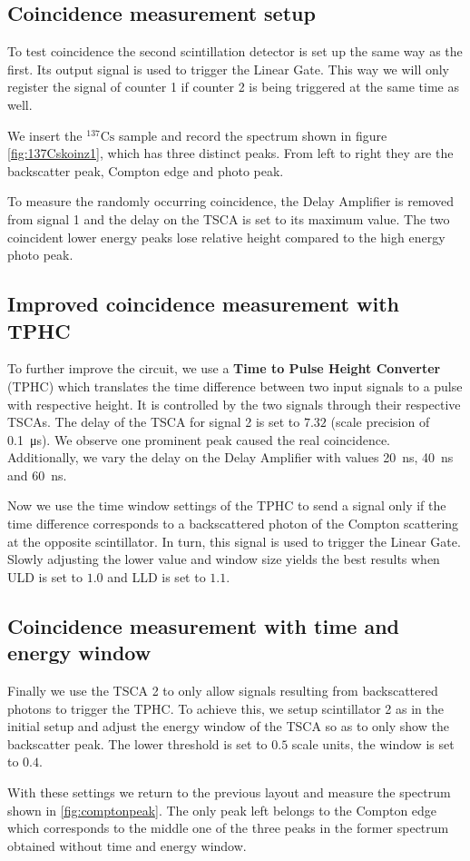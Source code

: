 \subsection*{Coincidence measurement setup}
%
To test coincidence the second scintillation detector is set up the same way as the first.
Its output signal is used to trigger the Linear Gate.
This way we will only register the signal of counter 1 if counter 2 is being triggered at the same time as well.
%
\par
%
We insert the $^{137}\text{Cs}$ sample and record the spectrum shown in figure \ref{fig:137Cskoinz1}, which has three distinct peaks.
From left to right they are the backscatter peak, Compton edge and photo peak.
%
\par
%
To measure the randomly occurring coincidence, the Delay Amplifier is removed from signal 1 and  the delay on the TSCA is set to its maximum value.
The two coincident lower energy peaks lose relative height compared to the high energy photo peak.
%
\subsection*{Improved coincidence measurement with TPHC}
%
To further improve the circuit, we use a \textbf{Time to Pulse Height Converter} (TPHC) which translates the time difference between two input signals to a pulse with respective height.
It is controlled by the two signals through their respective TSCAs.
The delay of the TSCA for signal 2 is set to $7.32$ (scale precision of \SI{0.1}{\micro\second}).
We observe one prominent peak caused the real coincidence.
Additionally, we vary the delay on the Delay Amplifier with values \SI{20}{\nano\second}, \SI{40}{\nano\second} and \SI{60}{\nano\second}.
%
\par
%
Now we use the time window settings of the TPHC to send a signal only if the time difference corresponds to a backscattered photon of the Compton scattering at the opposite scintillator.
In turn, this signal is used to trigger the Linear Gate.
Slowly adjusting the lower value and window size yields the best results when ULD is set to $1.0$ and LLD is set to $1.1$.
%
\subsection*{Coincidence measurement with time and energy window}
%
Finally we use the TSCA 2 to only allow signals resulting from backscattered photons to trigger the TPHC.
To achieve this, we setup scintillator 2 as in the initial setup and adjust the energy window of the TSCA so as to only show the backscatter peak.
The lower threshold is set to $0.5$ scale units, the window is set to $0.4$.
%
\par
%
With these settings we return to the previous layout and measure the spectrum shown in \ref{fig:comptonpeak}.
The only peak left belongs to the Compton edge which corresponds to the middle one of the three peaks in the former spectrum obtained without time and energy window.
%
